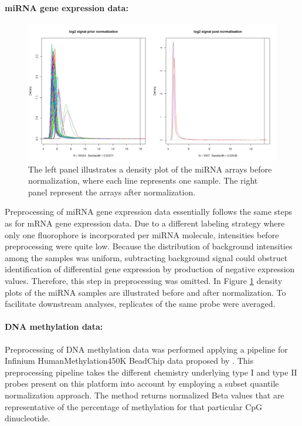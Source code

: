 \paragraph{miRNA gene expression data:}

\begin{figure}[h!]
\centering
\includegraphics[scale=0.3]{Before-AfterNormalization.jpeg}  
\caption{The left panel illustrates a density plot of the miRNA arrays before normalization, where each line represents one sample. The right panel represent the arrays after normalization.}
\label{fig:miRNAnormalization}
\end{figure}

Preprocessing of miRNA gene expression data essentially follows the same steps as for mRNA gene expression data. Due to a different labeling strategy where only one fluorophore is incorporated per miRNA molecule, intensities before preprocessing were quite low. Because the distribution of background intensities among the samples was uniform, subtracting background signal could obstruct identification of differential gene expression by production of negative expression values. Therefore, this step in preprocessing was omitted. In Figure \ref{fig:miRNAnormalization} density plots of the miRNA samples are illustrated before and after normalization. To facilitate downstream analyses, replicates of the same probe were averaged.

\paragraph{DNA methylation data:}
 Preprocessing of DNA methylation data was performed applying a pipeline for Infinium HumanMethylation450K BeadChip data proposed by \cite{Touleimat2012}. This preprocessing pipeline takes the different chemistry underlying type I and type II probes present on this platform into account by employing a subset  quantile normalization approach. The method returns normalized Beta values that are representative of the percentage of methylation for that particular CpG dinucleotide.


